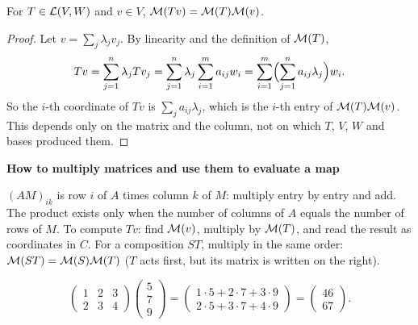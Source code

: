 \documentclass[10pt]{scrartcl}
\newenvironment{methodbox}[1]{\begin{mdframed}[style=methodstyle]\textbf{\color{NavyBlue}#1}\par\vspace{2pt}}{\end{mdframed}}
\begin{document}
\begin{proposition*}
  For $T\in\mathcal L(V,W)$ and $v\in V$, $\mathcal M(Tv)=\mathcal M(T)\mathcal M(v)$.
\end{proposition*}
\begin{proof}
  Let $v=\sum_j\lambda_jv_j$. By linearity and the definition of $\mathcal M(T)$,
  \[
    Tv=\sum_{j=1}^n\lambda_jTv_j=\sum_{j=1}^n\lambda_j\sum_{i=1}^ma_{ij}w_i=\sum_{i=1}^m\Bigl(\sum_{j=1}^na_{ij}\lambda_j\Bigr)w_i .
  \]
  So the $i$-th coordinate of $Tv$ is $\sum_ja_{ij}\lambda_j$, which is the $i$-th entry of $\mathcal M(T)\mathcal M(v)$. This depends only on the matrix and the column, not on which $T$, $V$, $W$ and bases produced them.
\end{proof}

\begin{methodbox}{How to multiply matrices and use them to evaluate a map}
  \begin{steps}
    \ii $(AM)_{ik}$ is row $i$ of $A$ times column $k$ of $M$: multiply entry by entry and add. The product exists only when the number of columns of $A$ equals the number of rows of $M$.
    \ii To compute $Tv$: find $\mathcal M(v)$, multiply by $\mathcal M(T)$, and read the result as coordinates in $C$.
    \ii For a composition $ST$, multiply in the same order: $\mathcal M(ST)=\mathcal M(S)\mathcal M(T)$ ($T$ acts first, but its matrix is written on the right).
  \end{steps}
\end{methodbox}

\begin{example*}
  \[
    \begin{pmatrix}1&2&3\\2&3&4\end{pmatrix}\begin{pmatrix}5\\7\\9\end{pmatrix}=\begin{pmatrix}1\cdot5+2\cdot7+3\cdot9\\2\cdot5+3\cdot7+4\cdot9\end{pmatrix}=\begin{pmatrix}46\\67\end{pmatrix}.
  \]
\end{example*}
\end{document}
